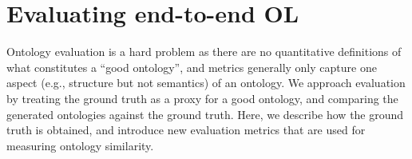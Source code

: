 \documentclass{article}
\newcommand{\todo}[1]{\textcolor{red}{TODO: #1}}
\begin{document}

\section{Evaluating end-to-end OL}

Ontology evaluation is a hard problem as there are no quantitative definitions of what constitutes a ``good ontology'', and metrics generally only capture one aspect (e.g., structure but not semantics) of an ontology. We approach evaluation by treating the ground truth as a proxy for a good ontology, and comparing the generated ontologies against the ground truth. Here, we describe how the ground truth is obtained, and introduce new evaluation metrics that are used for measuring ontology similarity.

\end{document}

